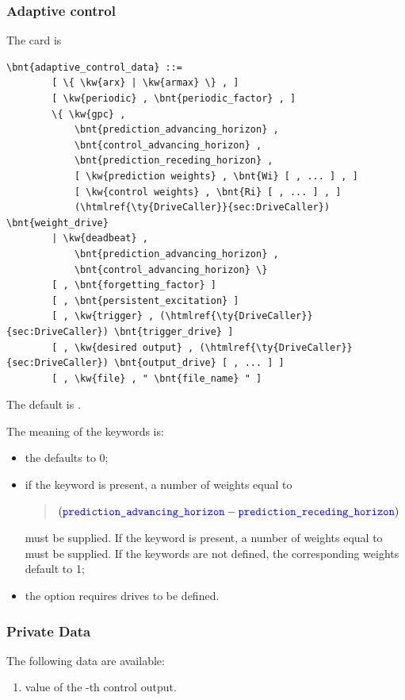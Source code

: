 \subsubsection{Adaptive control}
The  card is
\begin{Verbatim}[commandchars=\\\{\}]
    \bnt{adaptive_control_data} ::=
        [ \{ \kw{arx} | \kw{armax} \} , ]
        [ \kw{periodic} , \bnt{periodic_factor} , ]
        \{ \kw{gpc} ,
            \bnt{prediction_advancing_horizon} ,
            \bnt{control_advancing_horizon} ,
            \bnt{prediction_receding_horizon} ,
            [ \kw{prediction weights} , \bnt{Wi} [ , ... ] , ]
            [ \kw{control weights} , \bnt{Ri} [ , ... ] , ]
            (\htmlref{\ty{DriveCaller}}{sec:DriveCaller}) \bnt{weight_drive}
        | \kw{deadbeat} ,
            \bnt{prediction_advancing_horizon} ,
            \bnt{control_advancing_horizon} \}
        [ , \bnt{forgetting_factor} ]
        [ , \bnt{persistent_excitation} ]
        [ , \kw{trigger} , (\htmlref{\ty{DriveCaller}}{sec:DriveCaller}) \bnt{trigger_drive} ]
        [ , \kw{desired output} , (\htmlref{\ty{DriveCaller}}{sec:DriveCaller}) \bnt{output_drive} [ , ... ] ]
        [ , \kw{file} , " \bnt{file_name} " ]
\end{Verbatim}
The default is .

The meaning of the keywords is:
\begin{itemize}
\item the  defaults to 0;

\item if the keyword  is present,
a number of weights  equal to
\begin{quote}
$(\textcolor{blue}{\texttt{prediction\_advancing\_horizon}} - \textcolor{blue}{\texttt{prediction\_receding\_horizon}})$
\end{quote}
must be supplied.
If the keyword  is present,
a number of weights  equal to 
must be supplied.
If the keywords are not defined, the corresponding weights
default to 1;

\item the 
option requires  drives to be defined.
\end{itemize}

\subsubsection{Private Data}
The following data are available:
\begin{enumerate}
\item {} value of the -th control output.
\end{enumerate}


